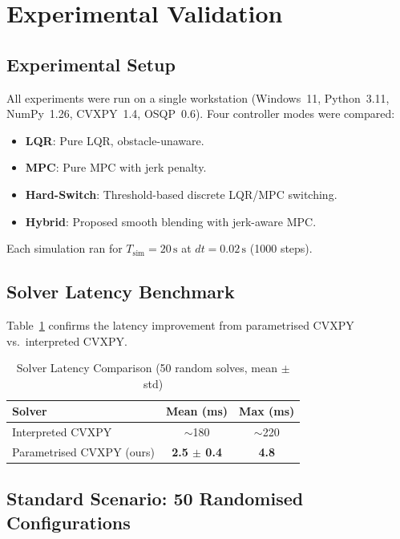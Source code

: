 \documentclass[journal]{IEEEtran}
\begin{document}
\section{Experimental Validation}\label{sec:experiments}

\subsection{Experimental Setup}

All experiments were run on a single workstation (Windows~11, Python~3.11,
NumPy~1.26, CVXPY~1.4, OSQP~0.6).
Four controller modes were compared:
\begin{itemize}
  \item \textbf{LQR}: Pure LQR, obstacle-unaware.
  \item \textbf{MPC}: Pure MPC with jerk penalty.
  \item \textbf{Hard-Switch}: Threshold-based discrete LQR/MPC switching.
  \item \textbf{Hybrid}: Proposed smooth blending with jerk-aware MPC.
\end{itemize}

Each simulation ran for \(T_{\mathrm{sim}}=20\,\text{s}\) at \(dt=0.02\,\text{s}\)
(1000 steps).

\subsection{Solver Latency Benchmark}

Table~\ref{tab:solver} confirms the latency improvement from parametrised
CVXPY vs.\ interpreted CVXPY.

\begin{table}[!t]
  \caption{Solver Latency Comparison (50 random solves, mean $\pm$ std)}
  \label{tab:solver}
  \centering
  \begin{tabular}{lcc}
    \toprule
    Solver            & Mean (ms) & Max (ms) \\
    \midrule
    Interpreted CVXPY & $\sim$180 & $\sim$220 \\
    Parametrised CVXPY (ours) & \textbf{2.5 $\pm$ 0.4} & \textbf{4.8} \\
    \bottomrule
  \end{tabular}
\end{table}

\subsection{Standard Scenario: 50 Randomised Configurations}
\end{document}
